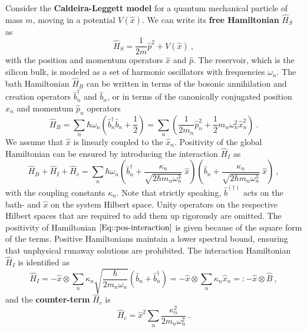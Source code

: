 	Consider the \textbf{Caldeira-Leggett model} \cite{caldeira1981influence} for a quantum mechanical particle of mass $m$, moving in a potential $V(\hat{x})$. We can write its \textbf{free Hamiltonian} $\hat{H}_S$ as
	\begin{equation}
		\hat{H}_S =	\frac{1}{2m} \hat{p}^2 + V(\hat{x})~,
	\end{equation}
	with the position and momentum operators $\hat{x}$ and $\hat{p}$. The reservoir, which is the silicon bulk, is modeled as a set of harmonic oscillators with frequencies $\omega_n$. The bath Hamiltonian $\hat{H}_B$ can be written in terms of the bosonic annihilation and creation operators $\hat{b}_n^\dagger$ and $\hat{b}_n$, or in terms of the canonically conjugated position $\hat{x}_n$ and momentum $\hat{p}_n$ operators
	\begin{equation}
		\hat{H}_B =	\sum_n \hbar \omega_n \left(\hat{b}_n^\dagger \hat{b}_n + \frac{1}{2} \right) =	\sum_n \left(\frac{1}{2 m_n} \hat{p}_n^2 + \frac{1}{2} m_n \omega_n^2 \hat{x}_n^2 \right)~.
	\end{equation}
	We assume that $\hat{x}$ is linearly coupled to the $\hat{x}_n$. Positivity of the global Hamiltonian can be ensured by introducing the interaction $\hat{H}_I$ as
	\begin{equation} \label{Eq::pos-interaction}
		\hat{H}_B + \hat{H}_I + \hat{H}_c  =	\sum_n \hbar \omega_n \left(\hat{b}_n^\dagger  +   \frac{\kappa_n}{\sqrt{2 \hbar m_n \omega_n^3}}~\hat{x} \right) \left(\hat{b}_n  + \frac{\kappa_n}{\sqrt{2 \hbar m_n \omega_n^3}}~\hat{x}\right) ~,
	\end{equation}
	with the coupling constants $\kappa_n$.
	Note that strictly speaking, $\hat{b}^{(\dagger)}$ acts on the bath- and $\hat{x}$ on the system Hilbert space. Unity operators on the respective Hilbert spaces that are required to add them up rigorously are omitted. The positivity of Hamiltonian $\eqref{Eq::pos-interaction}$ is given because of the square form of the terms.  Positive Hamiltonians maintain a lower spectral bound, ensuring that unphysical runaway solutions are prohibited.	The interaction Hamiltonian $\hat{H}_I$ is identified as
	\begin{equation}
		\hat{H}_I =	-\hat{x} \otimes \sum_n \kappa_n \sqrt{\frac{\hbar}{2 m_n \omega_n}} \left(\hat{b}_n + \hat{b}_n^\dagger\right) = - \hat{x} \otimes \sum_n \kappa_n \hat{x}_n	 =:	- \hat{x} \otimes \hat{B} ~,
	\end{equation}
	and the \textbf{counter-term} $\hat{H}_c$ is
	\begin{equation} \label{Eq::counter-term}
		\hat{H}_c =	\hat{x}^2 \sum_n \frac{\kappa_n^2}{2 m_n \omega_n^2} ~.
	\end{equation}
